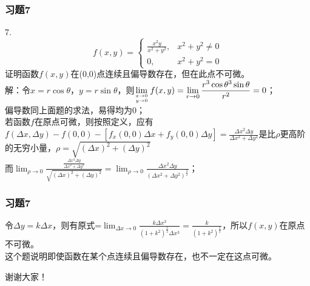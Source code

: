 \documentclass[xetex]{beamer}
\begin{document}
\begin{frame}
    \frametitle{习题7} 
   7.$$
f(x,y)=
\left
\{\begin{array}{cc} 
		\frac{x^2 y}{x^2+y^2}, & x^2+y^2 \ne 0\\ 
		0, &  x^2+y^2 = 0
\end{array}\right.
$$ 
证明函数$f(x,y)$在(0,0)点连续且偏导数存在，但在此点不可微。
	\\解：令$x=r\cos\theta$，$y= r\sin\theta$，则$\displaystyle\lim_{x \to 0 \atop y \to 0}f(x,y)=\displaystyle\lim_{r \to 0}\frac{r^3 \cos \theta^3 \sin \theta}{r^2}=0$；\\
偏导数同上面题的求法，易得均为0；\\
若函数$f$在原点可微，则按照定义，应有$f(\Delta x,\Delta y)-f(0,0)-[f_{x}(0,0)\Delta x+f_{y}(0,0)\Delta y]=\frac{\Delta x^2 \Delta y}{\Delta x^2 + \Delta y^2}$是比$\rho$更高阶的无穷小量，$\rho = \sqrt{(\Delta x)^2+(\Delta y)^2}$\\
而$\displaystyle\lim_{\rho \to 0}\frac{\frac{\Delta x^2 \Delta y}{\Delta x^2 + \Delta y^2}}{ \sqrt{(\Delta x)^2+(\Delta y)^2}}=\displaystyle\lim_{\rho \to 0}\frac{\Delta x^2 \Delta y}{(\Delta x^2 + \Delta y^2)^\frac {3}{2}}$；
 
\end{frame}
\begin{frame} 
\frametitle{习题7}
令$\Delta y = k \Delta x$，则有原式=$\displaystyle\lim_{\Delta x \to 0}\frac{k \Delta x^3}{(1+k^2)^\frac{3}{2}\Delta x^3}=\frac{k}{(1+k^2)^\frac{3}{2}}$，所以$f(x,y)$在原点不可微。\\这个题说明即使函数在某个点连续且偏导数存在，也不一定在这点可微。
\end{frame}
\begin{frame}[standout]
谢谢大家！
\end{frame}

 
\end{document}
